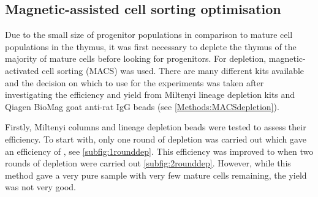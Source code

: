 \subsection{Magnetic-assisted cell sorting optimisation}

Due to the small size of progenitor populations in comparison to mature cell populations in the thymus, it was first necessary to deplete the thymus of the majority of mature cells before looking for progenitors.
For depletion, magnetic-activated cell sorting (MACS) was used.
There are many different kits available and the decision on which to use for the experiments was taken after investigating the efficiency and yield from Miltenyi lineage depletion kits and Qiagen BioMag goat anti-rat IgG beads (see \cref{Methods:MACSdepletion}).

Firstly, Miltenyi columns and lineage depletion beads were tested to assess their efficiency.
To start with, only one round of depletion was carried out which gave an efficiency of , see \cref{subfig:1rounddep}.
This efficiency was improved to  when two rounds of depletion were carried out \cref{subfig:2rounddep}. 
However, while this method gave a very pure sample with very few mature cells remaining, the yield was not very good.

